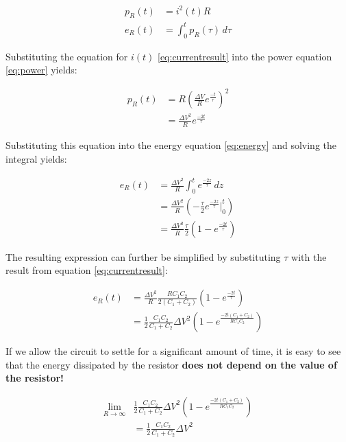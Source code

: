 \begin{align}
    p_R(t) &= i^2(t) R \label{eq:power} \\
    e_R(t) &= \int_0^t p_R(\tau)\,d\tau \label{eq:energy}
\end{align}

Substituting  the equation for $i(t)$ \ref{eq:currentresult}  into  the  power
equation \ref{eq:power} yields:

\begin{align}
    p_R(t) &= R\left(\frac{\Delta V}{R} e^{\frac{-t}{\tau}}\right)^2 \\
           &= \frac{{\Delta V}^2}{R} e^{\frac{-2t}{\tau}}
\end{align}

Substituting  this  equation  into the  energy  equation  \ref{eq:energy}  and
solving the integral yields:

\begin{align}
    e_R(t) &= \frac{{\Delta V}^2}{R} \int_0^t e^{\frac{-2z}{\tau}}\,dz \\
           &= \frac{{\Delta V}^2}{R} \left(-\frac{\tau}{2} e^{\frac{-2z}{\tau}} \bigg|_0^t\right) \\
           &= \frac{{\Delta V}^2}{R} \frac{\tau}{2}\left(1 - e^{\frac{-2t}{\tau}}\right)
\end{align}

The resulting expression can further be simplified by substituting $\tau$ with
the result from equation \ref{eq:currentresult}:

\begin{align}
    e_R(t) &= \frac{{\Delta V}^2}{R} \frac{RC_1C_2}{2\left(C_1+C_2\right)}\left(1 - e^{\frac{-2t}{\tau}}\right) \\
           &= \frac{1}{2} \frac{C_1C_2}{C_1+C_2} {\Delta V}^2 \left(1 - e^{\frac{-2t\left(C_1+C_2\right)}{RC_1C_2}}\right)
\end{align}

If we allow the circuit to settle for a significant amount of time, it is easy
to see that  the  energy dissipated by the resistor \textbf{does not depend on
the value of the resistor!}

\begin{align}
    \lim_{R\to\infty} & \frac{1}{2} \frac{C_1C_2}{C_1+C_2} {\Delta V}^2 \left(1 - e^{\frac{-2t\left(C_1+C_2\right)}{RC_1C_2}}\right) \\
    &= \frac{1}{2} \frac{C_1C_2}{C_1+C_2} {\Delta V}^2 \label{eq:finalresult}
\end{align}

